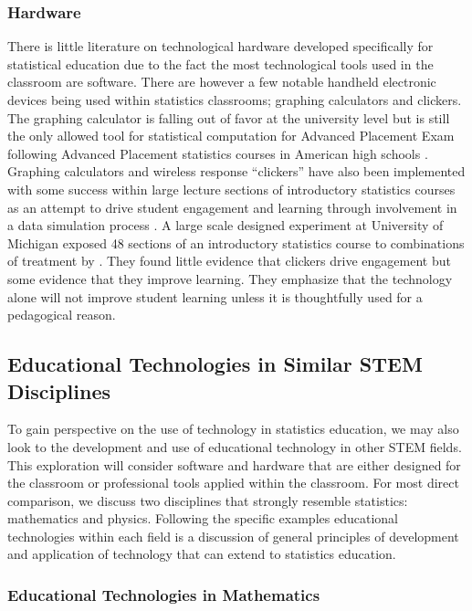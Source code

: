 \documentclass[11pt]{isuthesis}\usepackage[]{graphicx}\usepackage[]{color}
\begin{document}
\subsubsection{Hardware} 

There is little literature on technological hardware developed specifically for statistical education due to the fact the most technological tools used in the classroom are software. There are however a few notable handheld electronic devices being used within statistics classrooms; graphing calculators and clickers. The graphing calculator is falling out of favor at the university level but is still the only allowed tool for statistical computation for Advanced Placement Exam following Advanced Placement statistics courses in American high schools \citep{APcalculator}. Graphing calculators and wireless response ``clickers'' have also been implemented with some success within large lecture sections of introductory statistics courses as an attempt to drive student engagement and learning through involvement in a data simulation process \citep{Kaplan2011}.  A large scale designed experiment at University of Michigan exposed 48 sections of an introductory statistics course to combinations of treatment by \citet{McGowanGunderson2010}. They found little evidence that clickers drive engagement but some evidence that they improve learning. They emphasize that the technology alone will not improve student learning unless it is thoughtfully used for a pedagogical reason.

\subsection{Educational Technologies in Similar STEM Disciplines}
\label{EdTechSTEM}

To gain perspective on the use of technology in statistics education, we may also look to the development and use of educational technology in other STEM fields. This exploration will consider software and hardware that are either designed for the classroom or professional tools applied within the classroom. For most direct comparison, we discuss two disciplines that strongly resemble statistics: mathematics and physics. Following the specific examples educational technologies within each field is a discussion of general principles of development and application of technology that can extend to statistics education. 

\subsubsection{Educational Technologies in Mathematics}
\label{EdTechMath}
\end{document}
